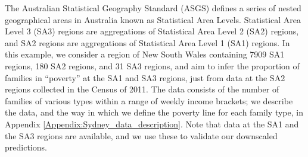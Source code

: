 \documentclass[12pt,a4paper]{article}
\begin{document}
The Australian Statistical Geography Standard (ASGS) defines a series of nested geographical areas in Australia known as Statistical Area Levels. 
Statistical Area Level 3 (SA3) regions are aggregations of Statistical Area Level 2 (SA2) regions, and SA2 regions are aggregations of  Statistical Area Level 1 (SA1) regions. 
In this example, we consider a region of New South Wales containing 7909 SA1 regions, 180 SA2 regions, and 31 SA3 regions, and aim to infer the proportion of families in ``poverty'' at the SA1 and SA3 regions, just from data at the SA2 regions  collected in the Census of 2011. 
The data consists of the number of families of various types within a range of weekly income brackets; we describe the data, and the way in which we define the poverty line for each family type, in Appendix \ref{Appendix:Sydney_data_description}. 
Note that data at the SA1 and the SA3 regions are available, and we use these to validate our downscaled predictions. 
\end{document}
